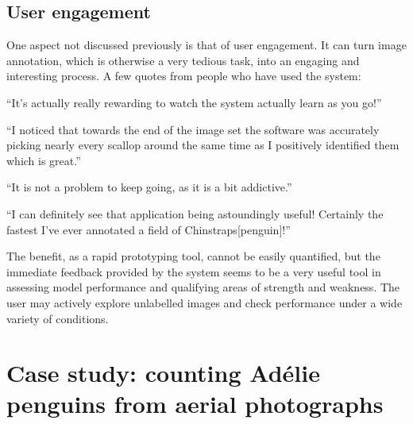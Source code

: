 \subsection{User engagement}
\label{sec:engagement}

One aspect not discussed previously is that of user engagement. It can turn image annotation, which is otherwise a very tedious task, into an engaging and interesting process. A few quotes from people who have used the system:

\begin{displayquote}
``It's actually really rewarding to watch the system actually learn as you go!''
\end{displayquote}

\begin{displayquote}
``I noticed that towards the end of the image set the software was accurately picking nearly every scallop around the same time as I positively identified them which is great.''
\end{displayquote}

\begin{displayquote}
 ``It is not a problem to keep going, as it is a bit addictive.''
\end{displayquote}

\begin{displayquote}
``I can definitely see that application being astoundingly useful! Certainly the fastest I've ever annotated a field of Chinstraps[penguin]!''
\end{displayquote}

The benefit, as a rapid prototyping tool, cannot be easily quantified, but the immediate feedback provided by the system seems to be a very useful tool in assessing model performance and qualifying areas of strength and weakness. The user may actively explore unlabelled images and check performance under a wide variety of conditions.


\section{Case study: counting Ad\'elie penguins from aerial photographs}
\label{sec:case_penguins}

